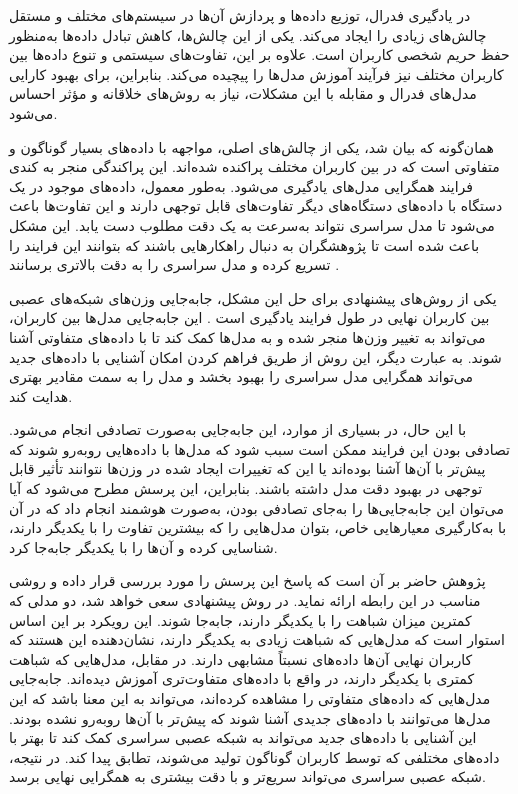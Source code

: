 در یادگیری فدرال، توزیع داده‌ها و پردازش آن‌ها در سیستم‌های مختلف و مستقل چالش‌های زیادی را ایجاد می‌کند. یکی از این چالش‌ها، کاهش تبادل داده‌ها به‌منظور حفظ حریم شخصی کاربران است. علاوه بر این، تفاوت‌های سیستمی و تنوع داده‌ها بین کاربران مختلف نیز فرآیند آموزش مدل‌ها را پیچیده می‌کند. بنابراین، برای بهبود کارایی مدل‌های فدرال و مقابله با این مشکلات، نیاز به روش‌های خلاقانه و مؤثر احساس می‌شود.

همان‌گونه که بیان شد، یکی از چالش‌های اصلی، مواجهه با داده‌های بسیار گوناگون و متفاوتی است که در بین کاربران مختلف پراکنده شده‌اند. این پراکندگی منجر به کندی فرایند همگرایی مدل‌های یادگیری می‌شود. به‌طور معمول، داده‌های موجود در یک دستگاه با داده‌های دستگاه‌های دیگر تفاوت‌های قابل توجهی دارند و این تفاوت‌ها باعث می‌شود تا مدل سراسری نتواند به‌سرعت به یک دقت مطلوب دست یابد. این مشکل باعث شده است تا پژوهشگران به دنبال راهکارهایی باشند که بتوانند این فرایند را تسریع کرده و مدل سراسری را به دقت بالاتری برسانند
\cite{li2020federated}.

یکی از روش‌های پیشنهادی برای حل این مشکل، جابه‌جایی وزن‌های شبکه‌های عصبی بین کاربران نهایی در طول فرایند یادگیری است
\cite{chiu2020semisupervised}.
این جابه‌جایی مدل‌ها بین کاربران، می‌تواند به تغییر وزن‌ها منجر شده و به مدل‌ها کمک کند تا با داده‌های متفاوتی آشنا شوند.
به عبارت دیگر، این روش از طریق فراهم کردن امکان آشنایی با داده‌های جدید می‌تواند همگرایی مدل سراسری را بهبود بخشد و مدل را به سمت مقادیر بهتری هدایت کند.

با این حال، در بسیاری از موارد، این جابه‌جایی به‌صورت تصادفی انجام می‌شود. تصادفی بودن این فرایند ممکن است سبب شود که مدل‌ها با داده‌هایی روبه‌رو شوند که پیش‌تر با آن‌ها آشنا بوده‌اند یا این که تغییرات ایجاد شده در وزن‌ها نتوانند تأثیر قابل‌ توجهی در بهبود دقت مدل داشته باشند. بنابراین، این پرسش مطرح می‌شود که آیا می‌توان این جابه‌جایی‌ها را به‌جای تصادفی بودن، به‌صورت هوشمند انجام داد که در آن با به‌کارگیری معیارهایی خاص، بتوان مدل‌هایی را که بیشترین تفاوت را با یکدیگر دارند، شناسایی کرده و آن‌ها را با یکدیگر جابه‌جا کرد.

پژوهش حاضر بر آن است که پاسخ این پرسش را مورد بررسی قرار داده و روشی مناسب در این رابطه ارائه نماید. در روش پیشنهادی سعی خواهد شد، دو مدلی که کمترین میزان شباهت را با یکدیگر دارند، جابه‌جا شوند. این رویکرد بر این اساس استوار است که مدل‌هایی که شباهت زیادی به یکدیگر دارند، نشان‌دهنده این هستند که کاربران نهایی آن‌ها داده‌های نسبتاً مشابهی دارند. در مقابل، مدل‌هایی که شباهت کمتری با یکدیگر دارند، در واقع با داده‌های متفاوت‌تری آموزش دیده‌اند.
جابه‌جایی مدل‌هایی که داده‌های متفاوتی را مشاهده کرده‌اند، می‌تواند به این معنا باشد که این مدل‌ها می‌توانند با داده‌های جدیدی آشنا شوند که پیش‌تر با آن‌ها روبه‌رو نشده بودند. این آشنایی با داده‌های جدید می‌تواند به شبکه عصبی سراسری کمک کند تا بهتر با داده‌های مختلفی که توسط کاربران گوناگون تولید می‌شوند، تطابق پیدا کند. در نتیجه، شبکه عصبی سراسری می‌تواند سریع‌تر و با دقت بیشتری به همگرایی نهایی برسد.


